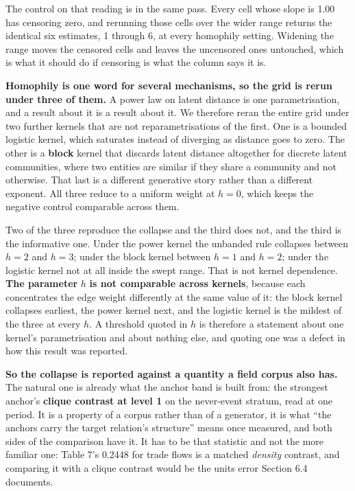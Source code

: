 \documentclass[twoside,11pt]{article}
\begin{document}
The control on that reading is in the same pass. Every cell whose slope is 1.00 has censoring zero, and rerunning those cells over the wider range returns the identical six estimates, 1 through 6, at every homophily setting. Widening the range moves the censored cells and leaves the uncensored ones untouched, which is what it should do if censoring is what the column says it is.

\textbf{Homophily is one word for several mechanisms, so the grid is rerun under three of them.} A power law on latent distance is one parametrisation, and a result about it is a result about it. We therefore reran the entire grid under two further kernels that are not reparametrisations of the first. One is a bounded logistic kernel, which saturates instead of diverging as distance goes to zero. The other is a \textbf{block} kernel that discards latent distance altogether for discrete latent communities, where two entities are similar if they share a community and not otherwise. That last is a different generative story rather than a different exponent. All three reduce to a uniform weight at \(h = 0\), which keeps the negative control comparable across them.

Two of the three reproduce the collapse and the third does not, and the third is the informative one. Under the power kernel the unbanded rule collapses between \(h = 2\) and \(h = 3\); under the block kernel between \(h = 1\) and \(h = 2\); under the logistic kernel not at all inside the swept range. That is not kernel dependence. \textbf{The parameter} \(h\) \textbf{is not comparable across kernels}, because each concentrates the edge weight differently at the same value of it: the block kernel collapses earliest, the power kernel next, and the logistic kernel is the mildest of the three at every \(h\). A threshold quoted in \(h\) is therefore a statement about one kernel's parametrisation and about nothing else, and quoting one was a defect in how this result was reported.

\textbf{So the collapse is reported against a quantity a field corpus also has.} The natural one is already what the anchor band is built from: the strongest anchor's \textbf{clique contrast at level 1} on the never-event stratum, read at one period. It is a property of a corpus rather than of a generator, it is what ``the anchors carry the target relation's structure'' means once measured, and both sides of the comparison have it. It has to be that statistic and not the more familiar one: Table 7's 0.2448 for trade flows is a matched \emph{density} contrast, and comparing it with a clique contrast would be the units error Section 6.4 documents.
\end{document}
